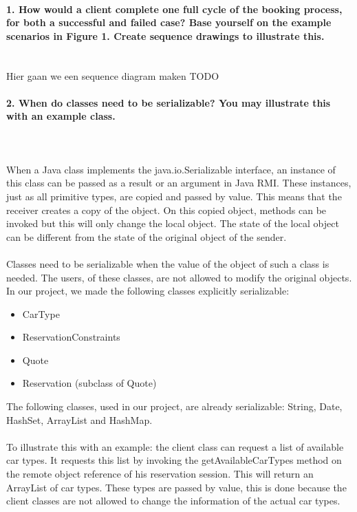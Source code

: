 \documentclass{ds-report}
\begin{document}
	\maketitle

	\paragraph{1. How would a client complete one full cycle of the booking process, for both a successful and
failed case? Base yourself on the example scenarios in Figure 1. Create sequence drawings to
illustrate this.} \mbox{}\\
	Hier gaan we een sequence diagram maken TODO
	
	\paragraph{2. When do classes need to be serializable? You may illustrate this with an example class.} \mbox{}\\\\
When a Java class implements the java.io.Serializable interface, an instance of this class can be passed as a result or an argument in Java RMI. These instances, just as all primitive types, are copied and passed by value. This means that the receiver creates a copy of the object. On this copied object, methods can be invoked but this will only change the local object. The state of the local object can be different from the state of the original object of the sender. \\\\
Classes need to be serializable when the value of the object of such a class is needed. The users, of these classes, are not allowed to modify the original objects. In our project, we made the following classes explicitly serializable:
\begin{itemize}
	\item CarType 
	\item ReservationConstraints 
	\item Quote
	\item Reservation (subclass of Quote)
\end{itemize}
The following classes, used in our project, are already serializable: String, Date, HashSet, ArrayList and HashMap.\\\\
To illustrate this with an example: the client class can request a list of available car types. It requests this list by invoking the getAvailableCarTypes method on the remote object reference of his reservation session. This will return an ArrayList of car types. These types are passed by value, this is done because the client classes are not allowed to change the information of the actual car types.
\end{document}
